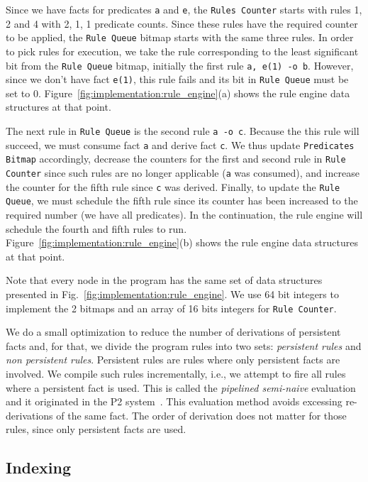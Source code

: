 Since we have facts for predicates \texttt{a} and \texttt{e}, the \texttt{Rules
Counter} starts with rules 1, 2 and 4 with 2, 1, 1 predicate counts. Since these
rules have the required counter to be applied, the \texttt{Rule Queue} bitmap
starts with the same three rules.  In order to pick rules for execution, we take
the rule corresponding to the least significant bit from the \texttt{Rule Queue}
bitmap, initially the first rule \texttt{a, e(1) -o b}. However, since we don't
have fact \texttt{e(1)}, this rule fails and its bit in \texttt{Rule Queue} must
be set to 0.  Figure~\ref{fig:implementation:rule_engine}(a) shows the rule
engine data structures at that point.

The next rule in \texttt{Rule Queue} is the second rule \texttt{a -o c}.
Because the this rule will succeed, we must consume fact \texttt{a} and derive
fact \texttt{c}. We thus update \texttt{Predicates Bitmap} accordingly, decrease
the counters for the first and second rule in \texttt{Rule Counter} since such
rules are no longer applicable (\texttt{a} was consumed), and increase the
counter for the fifth rule since \texttt{c} was derived. Finally, to update the
\texttt{Rule Queue}, we must schedule the fifth rule since its counter has been
increased to the required number (we have all predicates).  In the continuation,
the rule engine will schedule the fourth and fifth rules to run.
Figure~\ref{fig:implementation:rule_engine}(b) shows the rule engine data
structures at that point.

Note that every node in the program has the same set of data structures
presented in Fig.~\ref{fig:implementation:rule_engine}. We use 64 bit integers
to implement the 2 bitmaps and an array of 16 bits integers for \texttt{Rule
Counter}.

We do a small optimization to reduce the number of derivations of persistent
facts and, for that, we divide the program rules into two sets: \emph{persistent
rules} and \emph{non persistent rules}. Persistent rules are rules where only
persistent facts are involved. We compile such rules incrementally, i.e., we
attempt to fire all rules where a persistent fact is used. This is called the
\emph{pipelined semi-naive} evaluation and it originated in the P2
system~\cite{Loo-condie-garofalakis-p2}. This evaluation method avoids excessing
re-derivations of the same fact. The order of derivation does not matter for
those rules, since only persistent facts are used.

\subsection{Indexing}\label{sec:implementation:indexing}

